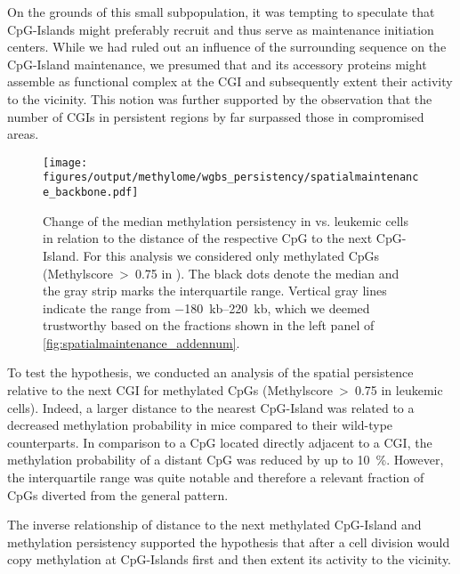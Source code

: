 On the grounds of this small subpopulation, it was tempting to speculate that CpG-Islands might preferably recruit  and thus serve as maintenance initiation centers. While we had ruled out an influence of the surrounding sequence on the CpG-Island maintenance, we presumed that  and its accessory proteins might assemble as functional complex at the CGI and subsequently extent their activity to the vicinity. This notion was further supported by the observation that the number of CGIs in persistent regions by far surpassed those in compromised areas.

\begin{figure}[!ht]
	\centering
	\texttt{[image: figures/output/methylome/wgbs\_persistency/spatialmaintenance\_backbone.pdf]}
	\caption{Change of the median methylation persistency in \dnmtchip vs. \dnmtwt \kitpos \mllafnine leukemic cells in relation to the distance of the respective CpG to the next CpG-Island. For this analysis we considered only methylated CpGs (Methylscore~>~\num{0.75} in \dnmtwt). The black dots denote the median and the gray strip marks the interquartile range. Vertical gray lines indicate the range from \SIrange{-180}{220}{\kilo b}, which we deemed trustworthy based on the fractions shown in the left panel of \autoref{fig:spatialmaintenance_addennum}.}
	\label{fig:spatialmaintenance_backbone}
\end{figure}

To test  the hypothesis, we conducted an analysis of the spatial persistence relative to the next CGI for methylated CpGs (Methylscore~>~\num{0.75} in \dnmtwt \kitpos \mllafnine leukemic cells). Indeed, a larger distance to the nearest CpG-Island was related to a decreased methylation probability in \dnmtchip mice compared to their wild-type counterparts. In comparison to a CpG located directly adjacent to a CGI, the methylation probability of a distant CpG was reduced by up to \SI{10}{\percent}. However, the interquartile range was quite notable and therefore a relevant fraction of CpGs diverted from the general pattern. 

The inverse relationship of distance to the next methylated CpG-Island and methylation persistency supported the hypothesis that  after a cell division would copy methylation at CpG-Islands first and then extent its activity to the vicinity. 

